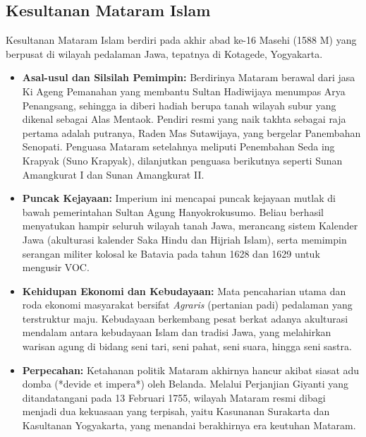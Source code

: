 \documentclass[12pt, a4paper]{article}
\begin{document}
\subsection{Kesultanan Mataram Islam}
Kesultanan Mataram Islam berdiri pada akhir abad ke-16 Masehi (1588 M) yang berpusat di wilayah pedalaman Jawa, tepatnya di Kotagede, Yogyakarta.
\begin{itemize}
	\item \textbf{Asal-usul dan Silsilah Pemimpin:} Berdirinya Mataram berawal dari jasa Ki Ageng Pemanahan yang membantu Sultan Hadiwijaya menumpas Arya Penangsang, sehingga ia diberi hadiah berupa tanah wilayah subur yang dikenal sebagai Alas Mentaok. Pendiri resmi yang naik takhta sebagai raja pertama adalah putranya, Raden Mas Sutawijaya, yang bergelar Panembahan Senopati. Penguasa Mataram setelahnya meliputi Penembahan Seda ing Krapyak (Suno Krapyak), dilanjutkan penguasa berikutnya seperti Sunan Amangkurat I dan Sunan Amangkurat II.
	\item \textbf{Puncak Kejayaan:} Imperium ini mencapai puncak kejayaan mutlak di bawah pemerintahan Sultan Agung Hanyokrokusumo. Beliau berhasil menyatukan hampir seluruh wilayah tanah Jawa, merancang sistem Kalender Jawa (akulturasi kalender Saka Hindu dan Hijriah Islam), serta memimpin serangan militer kolosal ke Batavia pada tahun 1628 dan 1629 untuk mengusir VOC.
	\item \textbf{Kehidupan Ekonomi dan Kebudayaan:} Mata pencaharian utama dan roda ekonomi masyarakat bersifat \textit{Agraris} (pertanian padi) pedalaman yang terstruktur maju. Kebudayaan berkembang pesat berkat adanya akulturasi mendalam antara kebudayaan Islam dan tradisi Jawa, yang melahirkan warisan agung di bidang seni tari, seni pahat, seni suara, hingga seni sastra.
	\item \textbf{Perpecahan:} Ketahanan politik Mataram akhirnya hancur akibat siasat adu domba (*devide et impera*) oleh Belanda. Melalui Perjanjian Giyanti yang ditandatangani pada 13 Februari 1755, wilayah Mataram resmi dibagi menjadi dua kekuasaan yang terpisah, yaitu Kasunanan Surakarta dan Kasultanan Yogyakarta, yang menandai berakhirnya era keutuhan Mataram.
\end{itemize}
\end{document}
